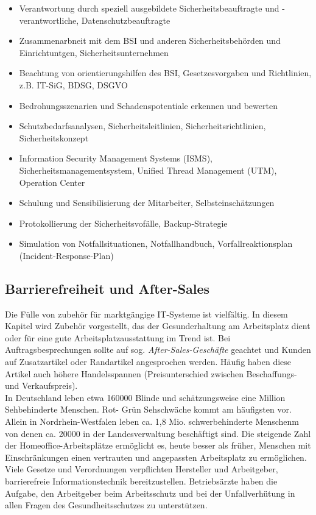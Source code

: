 \documentclass[a4paper, 12pt]{report}
\begin{document}
\begin{multicols}{2}
\begin{itemize}
    \item Verantwortung durch speziell ausgebildete Sicherheitsbeauftragte und
    -verantwortliche, Datenschutzbeauftragte
    \item Zusammenarbneit mit dem BSI und anderen Sicherheitsbehörden und
    Einrichtuntgen, Sicherheitsunternehmen
    \item Beachtung von orientierungshilfen des BSI, Gesetzesvorgaben und
    Richtlinien, z.B. IT-SiG, BDSG, DSGVO
    \item Bedrohungsszenarien und Schadenspotentiale erkennen und bewerten
    \item  Schutzbedarfsanalysen, Sicherheitsleitlinien, Sicherheitsrichtlinien,
    Sicherheitskonzept
    \item Information Security Management Systems (ISMS),
    Sicherheitsmanagementsystem, Unified Thread Management (UTM), Operation
    Center
    \item Schulung und Sensibilisierung der Mitarbeiter, Selbsteinschätzungen
    \item Protokollierung der Sicherheitsvofälle, Backup-Strategie
    \item Simulation von Notfallsituationen, Notfallhandbuch,
    Vorfallreaktionsplan (Incident-Response-Plan)
\end{itemize}

\subsection{Barrierefreiheit und After-Sales}

Die Fülle von zubehör für marktgängige IT-Systeme ist vielfältig. In diesem
Kapitel wird Zubehör vorgestellt, das der Gesunderhaltung am Arbeitsplatz dient
oder für eine gute Arbeitsplatzausstattung im Trend ist. Bei
Auftragsbesprechungen sollte auf sog. \emph{After-Sales-Geschäfte} geachtet und
Kunden auf Zusatzartikel oder Randartikel angesprochen werden. Häufig haben
diese Artikel auch höhere Handelsspannen (Preisunterschied zwischen
Beschaffungs- und Verkaufspreis). \\

In Deutschland leben etwa 160000 Blinde und schätzungsweise eine Million
Sehbehinderte Menschen. Rot- Grün Sehschwäche kommt am häufigsten vor. Allein
in Nordrhein-Westfalen leben ca. 1,8 Mio. schwerbehinderte Menschenm von denen
ca. 20000 in der Landesverwaltung beschäftigt sind. Die steigende Zahl der
Homeoffice-Arbeitsplätze  ermöglicht es, heute besser als früher, Menschen mit
Einschränkungen einen vertrauten und angepassten Arbeitsplatz zu ermöglichen.
Viele Gesetze und Verordnungen verpflichten Hersteller und Arbeitgeber,
barrierefreie Informationstechnik bereitzustellen. Betriebsärzte haben die
Aufgabe, den Arbeitgeber beim Arbeitsschutz und bei der Unfallverhütung in allen
Fragen des Gesundheitsschutzes zu unterstützen.


\end{multicols}
\end{document}
